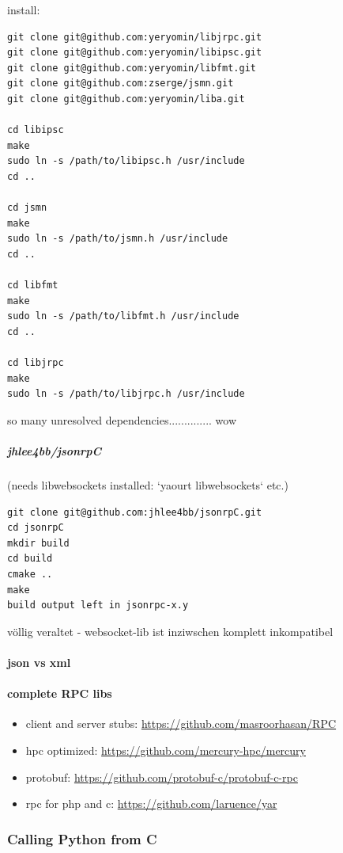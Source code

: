 \documentclass[a4paper,10pt]{article}
\begin{document}
install:

\begin{lstlisting}
git clone git@github.com:yeryomin/libjrpc.git
git clone git@github.com:yeryomin/libipsc.git
git clone git@github.com:yeryomin/libfmt.git
git clone git@github.com:zserge/jsmn.git
git clone git@github.com:yeryomin/liba.git

cd libipsc
make
sudo ln -s /path/to/libipsc.h /usr/include
cd ..

cd jsmn
make
sudo ln -s /path/to/jsmn.h /usr/include
cd ..

cd libfmt
make
sudo ln -s /path/to/libfmt.h /usr/include
cd ..

cd libjrpc
make
sudo ln -s /path/to/libjrpc.h /usr/include
\end{lstlisting}

so many unresolved dependencies.............. wow

\subparagraph{jhlee4bb/jsonrpC}

(needs libwebsockets installed: `yaourt libwebsockets` etc.)

\begin{lstlisting}
git clone git@github.com:jhlee4bb/jsonrpC.git
cd jsonrpC
mkdir build
cd build
cmake ..
make
build output left in jsonrpc-x.y
\end{lstlisting}

völlig veraltet - websocket-lib ist inziwschen komplett inkompatibel

\paragraph{json vs xml}

\paragraph{complete RPC libs}

\begin{itemize}
 \item client and server stubs: \url{https://github.com/masroorhasan/RPC}
 \item hpc optimized: \url{https://github.com/mercury-hpc/mercury}
 \item protobuf: \url{https://github.com/protobuf-c/protobuf-c-rpc}
 \item rpc for php and c: \url{https://github.com/laruence/yar}
\end{itemize}

\subsubsection{Calling Python from C}
\end{document}
